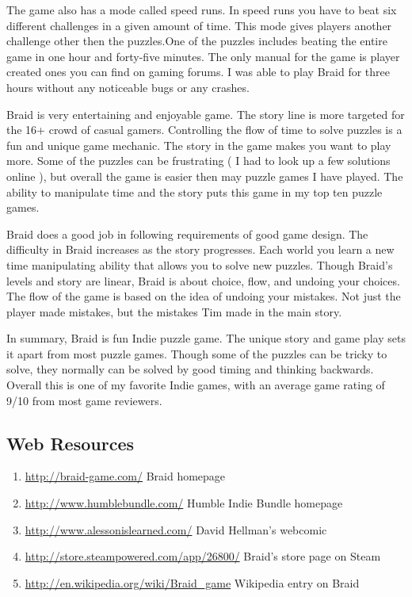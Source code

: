 \documentclass[a4paper,12pt]{report}
\begin{document}
The game also has a mode called speed runs.  In speed runs you have to beat six
different challenges in a given amount of time.  This mode gives players another
challenge other then the puzzles.One of the puzzles includes beating the entire
game in one hour and forty-five minutes.  The only manual for the game is player
created ones you can find on gaming forums.  I was able to play Braid for three
hours without any noticeable bugs or any crashes.

Braid is very entertaining and enjoyable game.  The story line is more targeted
for the 16+ crowd of casual gamers.  Controlling the flow of time to solve
puzzles is a fun and unique game mechanic.  The story in the game makes you want
to play more.  Some of the puzzles can be frustrating ( I had to look up a few
solutions online ), but overall the game is easier then may puzzle games
I have played.  The ability to manipulate time and the story puts this game in
my top ten puzzle games.

Braid does a good job in following requirements of good game design.  The
difficulty in Braid increases as the story progresses.  Each world you learn a
new time manipulating ability that allows you to solve new puzzles.  Though
Braid's levels and story are linear, Braid is about choice, flow, and undoing
your choices.  The flow of the game is based on the idea of undoing your
mistakes.  Not just the player made mistakes, but the mistakes Tim made in the
main story.

In summary, Braid is fun Indie puzzle game.  The unique story and game play sets
it apart from most puzzle games.  Though some of the puzzles can be tricky to
solve, they normally can be solved by good timing and thinking backwards.
Overall this is one of my favorite Indie games, with an average game rating of
9/10 from most game reviewers. 


\subsection*{Web Resources}

\begin{enumerate}
\item \label{braidlink}\url{http://braid-game.com/} Braid homepage
\item \label{hiblink}\url{http://www.humblebundle.com/} Humble Indie Bundle homepage
\item \label{artlink}\url{http://www.alessonislearned.com/} David Hellman's webcomic 
\item \label{steamlink} \url{http://store.steampowered.com/app/26800/} Braid's store page on Steam
\item \url{http://en.wikipedia.org/wiki/Braid_game} Wikipedia entry on Braid
\end{enumerate}
\end{document}
